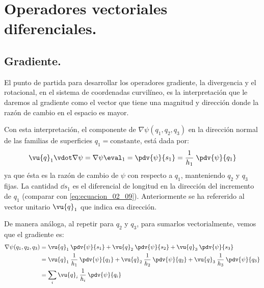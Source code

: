 \section{Operadores vectoriales diferenciales.}
\subsection{Gradiente.} 
El punto de partida para desarrollar los operadores gradiente, la divergencia y el rotacional, en el sistema de coordenadas curvilíneo, es la interpretación que le daremos al gradiente como el vector que tiene una magnitud y dirección donde la razón de cambio en el espacio es mayor.
\par
Con esta interpretación, el componente de $\nabla \psi(q_{1}, q_{2}, q_{3})$ en la dirección normal de las familias de superficies $q_{1} = \text{constante}$, está dada por:
\begin{equation}
\vu{q}_{1} \vdot \nabla \psi = \nabla \psi \eval_{1} = \pdv{\psi}{s_{1}} = \dfrac{1}{h_{1}} \; \pdv{\psi}{q_{1}}
\label{eq:ecuacion_02_17}
\end{equation}
ya que ésta es la razón de cambio de $\psi$ con respecto a $q_{1}$, manteniendo $q_{2}$ y $q_{3}$ fijas. La cantidad $\dd{s_{1}}$ es el diferencial de longitud en la dirección del incremento de $q_{1}$ (comparar con \ref{eq:ecuacion_02_09}). Anteriormente se ha refererido al vector unitario $\vu{q}_{1}$ que indica esa dirección.
\par
 De manera análoga, al repetir para $q_{2}$ y $q_{3}$, para sumarlos vectorialmente, vemos que el gradiente es:
\begin{align}
\begin{aligned}
\nabla \psi (q_{1}, q_{2}, q_{3}) &= \vu{q}_{1} \: \pdv{\psi}{s_{1}} + \vu{q}_{2} \: \pdv{\psi}{s_{2}} + \vu{q}_{3} \: \pdv{\psi}{s_{3}} \\
&= \vu{q}_{1} \: \dfrac{1}{h_{1}} \: \pdv{\psi}{q_{1}} + \vu{q}_{2} \: \dfrac{1}{h_{2}} \: \pdv{\psi}{q_{2}} + \vu{q}_{3} \: \dfrac{1}{h_{3}} \: \pdv{\psi}{q_{3}} \\
&= \sum_{i} \vu{q}_{i} \: \dfrac{1}{h_{i}} \: \pdv{\psi}{q_{i}}
\label{eq:ecuacion_02_18}
\end{aligned}
\end{align}
